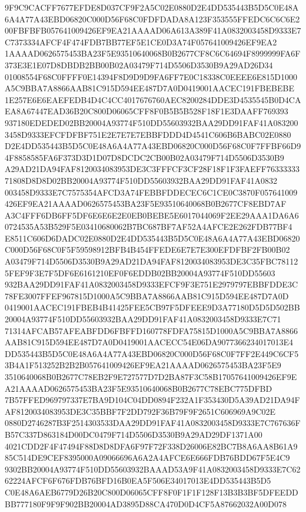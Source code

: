 \documentclass[UTF8,fontset=fandol,zihao=-4,a4paper]{ctexart}
\begin{document}
{{9F9C9CACFF7677EFDE8D037CF9F2A5C02E0880D2E4DD535443B5D5C0E48A6A4A77A43EBD06820C000D56F68C0FDFDADA8A123F353555FFEDC6C6C6E2
00FBFBFB057641009426EF9EA21AAAAD06A613A389F41A0832003458D9333E7C7373334AFCF4F474FDB7BB77EF5E1CE0D3A74F057641009426EF9EA2
1AAAAD0626575453BA23F5E93510640068B0B2677CF8C6C64694F8999999FA6F373E3E1E07D8DBDB2BB00B02A03479F714D5506D3530B9A29AD26D34
01008554F68C0FFFF0E14394F8D9D9D9FA6FF7E0C18338C0EEEE6E815D1000A5C9BBA7A8866AAB81C915D594EE487D7A0D0419001AACEC191FBEBEBE
1E257E6E6EAEFEDB4D4C4CC4017676760AEC8200284DDE3D4535545B0D4CAEA8A67447EAD36B20C800D06065CFF8F0B5B5B528F18F1E3DAAFF769393
937180EDEDED02BB20004A93774F510DD55603932BAA29DD91FAF41A0832003458D9333EFCFDFBF751E2E7E7E7EBBFDDD4D4541C606B6BABC02E0880
D2E4DD535443B5D5C0E48A6A4A77A43EBD06820C000D56F68C0F7FFBF66D94F8858585FA6F373D3D1D07D8DCDC2CB00B02A03479F714D5506D3530B9
A29AD21DA94FAF8120034083953DE3C3FFFCF3CF28F18F1F3FAEFF7633333371808D8D8D02BB20004A93774F510DD55603932BAA29DD91FAF41A0832
003458D9333E7C7575354AFCD3A74FEBBFDDECEC6C1CE0C3870F057641009426EF9EA21AAAAD0626575453BA23F5E93510640068B0B2677CF8EBD7AF
A3C4FFF6DB6FF5DF6E6E6E2E0EB0BEBE5E6017044069F2EE29AAA1DA6A60724535A53B529F5E03410680062B7BC687BF7AF52A4AFCE2E262FDB77BF4
E8511C606D6DADC02E0880D2E4DD535443B5D5C0E48A6A4A77A43EBD06820C000D56F68C0F5F59598912BFB4B454FFEDE6E7E7E300EFDFBF2FB00B02
A03479F714D5506D3530B9A29AD21DA94FAF8120034083953DE3C35FBC781125FEF9F3E7F5DF6E6161210EF0F6EDDB02BB20004A93774F510DD55603
932BAA29DD91FAF41A0832003458D9333EFCF9F3E751E2979797EBBFDDE3C78FE3007FFEF967815D1000A5C9BBA7A8866AAB81C915D594EE487D7A0D
0419001AACEC191FBEB4B41425FEE5CB97F5DFEEE9D3A77180D5D5D502BB20004A93774F510DD55603932BAA29DD91FAF41A0832003458D9333E7C71
71314AFCAB57AFEABFDD6FBFFD160778FDFA75815D1000A5C9BBA7A8866AAB81C915D594EE487D7A0D0419001AACECC54E06DA9077366234017013E4
DD535443B5D5C0E48A6A4A77A43EBD06820C000D56F68C0F7FF2E449C6CF53B4A1F513252B2B2B057641009426EF9EA21AAAAD0626575453BA23F5E9
3510640068B0B2677C78EB2F9E727577D7D2BA87F3C58B17057641009426EF9EA21AAAAD0626575453BA23F5E93510640068B0B2677C78EBC775DFBD
7B57FFED969797337E7BA9D104C04DD0894F232A1F353430D5A39AD21DA94FAF8120034083953DE3C35BBF7F2DD792F36B79F9F2651C606969A9C02E
0880D2746287B3F2514303533DAA29DD91FAF41A0832003458D9333E7C767636FB57C337D863184D00DC0479F714D5506D3530B9A29AD29DF1371A00
4021CDD2F4F47494F88D8D8DFA6F97F72F338D26006E82BC7B8A6AA8B61A985C514DE9CEF8395000A09066696A6A2A4AFCE6E666FDB76BDD67F5E4C9
9302BB20004A93774F510DD55603932BAAAD53A9F41A0832003458D9333E7C6262224AFCF6F676FDB76BFD16B0EA5F506E34017013E4DD535443B5D5
C0E48A6AEB6779D26B20C800D06065CFF8F0F1F1F128F13B3B3BF5DFEEDDBB777180F9F9F902BB20004AD3895D88CA470D0D4CF5A87662032A00D078
}}
\end{document}
